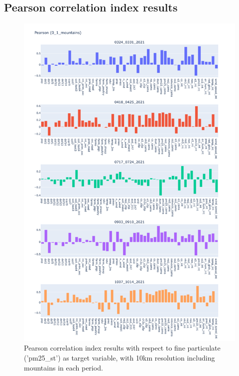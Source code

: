 \subsection{Pearson correlation index results}
\begin{figure}[H]
    \centering
    \includegraphics[scale=0.38]{images/tests/0_1_mountainspm25_st_pearson.png}
    \caption{Pearson correlation index results with respect to fine particulate ('pm25\_st') as target variable, with 10km resolution including mountains in each period. }
\end{figure}
